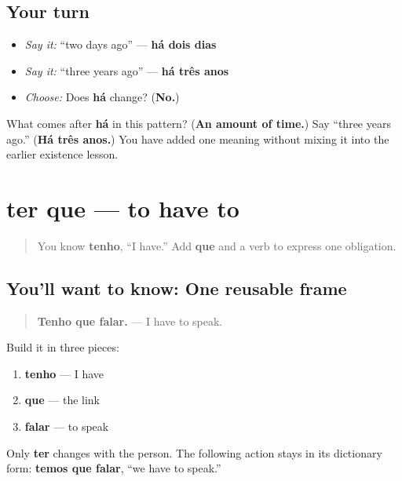 \subsection*{Your turn}
\begin{itemize}
\raggedright
  \item \emph{Say it:} “two days ago” — \textbf{há dois dias}
  \item \emph{Say it:} “three years ago” — \textbf{há três anos}
  \item \emph{Choose:} Does \textbf{há} change? (\textbf{No.})
\end{itemize}

\begin{tcolorbox}[breakable,colback=teal!4,colframe=teal!35!black,title={Before you move on}]
What comes after \textbf{há} in this pattern? (\textbf{An amount of time.}) Say “three years ago.” (\textbf{Há três anos.}) You have added one meaning without mixing it into the earlier existence lesson.
\end{tcolorbox}
\section[ter que]{ter que — to have to}

\label{lesson:PT-C18-ter-que}



\begin{quote}
You know \textbf{tenho}, “I have.” Add \textbf{que} and a verb to express one obligation.
\end{quote}

\subsection*{You'll want to know: One reusable frame}
\begin{quote}
\textbf{Tenho que falar.} — I have to speak.
\end{quote}

Build it in three pieces:

\begin{enumerate}
\raggedright
  \item \textbf{tenho} — I have
  \item \textbf{que} — the link
  \item \textbf{falar} — to speak
\end{enumerate}

Only \textbf{ter} changes with the person. The following action stays in its dictionary form: \textbf{temos que falar}, “we have to speak.”


